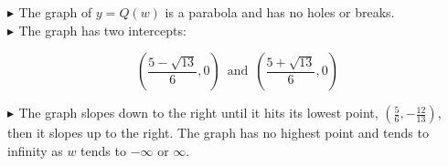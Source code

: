 \documentclass{ximera}
\begin{document}
\begin{exercise}
\begin{image}
\end{image}





\textbf{\textcolor{blue!55!black}{$\blacktriangleright$ }}  The graph of $y = Q(w)$ is a parabola and has no holes or breaks. \\

\textbf{\textcolor{blue!55!black}{$\blacktriangleright$ }}  The graph has two intercepts:


\[
\left( \frac{5 - \sqrt{13}}{6}, 0  \right) \, \text{ and } \,    \left( \frac{5 + \sqrt{13}}{6}, 0  \right)
\]









\textbf{\textcolor{blue!55!black}{$\blacktriangleright$ }}  The graph slopes down to the right until it hits its lowest point, $\left( \frac {5}{6}, -\frac{12}{13} \right)$, then it slopes up to the right.  The graph has no highest point and tends to infinity as $w$ tends to $-\infty$ or $\infty$.






\end{exercise}
\end{document}

